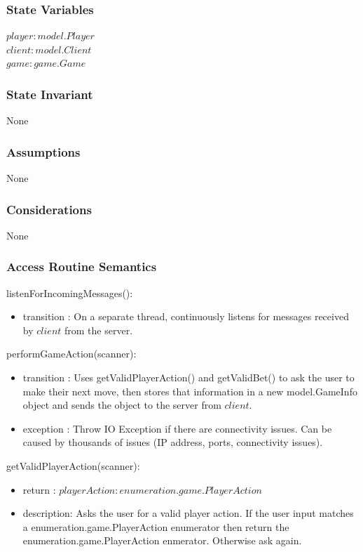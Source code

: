 \documentclass[12pt, titlepage]{article}
\begin{document}
    \subsubsection* {State Variables}
        $\mathit{player}: model.Player$\\
        $\mathit{client}: model.Client$\\
        $\mathit{game} : game.Game$\\
    
    \subsubsection* {State Invariant}
        None
    
    \subsubsection* {Assumptions}
        None
    
    \subsubsection* {Considerations}
        None
    
    \subsubsection* {Access Routine Semantics}
    
        \noindent listenForIncomingMessages():
        \begin{itemize}
        \item transition : On a separate thread, continuously listens for messages received by $\mathit{client}$ from the server.
        \end{itemize}
        
        \noindent performGameAction(scanner):
        \begin{itemize}
        \item transition : Uses getValidPlayerAction() and getValidBet() to ask the user to make their next move, then stores that information in a new model.GameInfo object and sends the object to the server from $client$.
        \item exception : Throw IO Exception if there are connectivity issues. Can be caused by thousands of issues (IP address, ports, connectivity issues).
        \end{itemize}
        
        \noindent getValidPlayerAction(scanner):
        \begin{itemize}
        \item return : $playerAction : enumeration.game.PlayerAction$
        \item description: Asks the user for a valid player action. If the user input matches a enumeration.game.PlayerAction enumerator then return the enumeration.game.PlayerAction enmerator. Otherwise ask again.
        \end{itemize}
        
\end{document}
